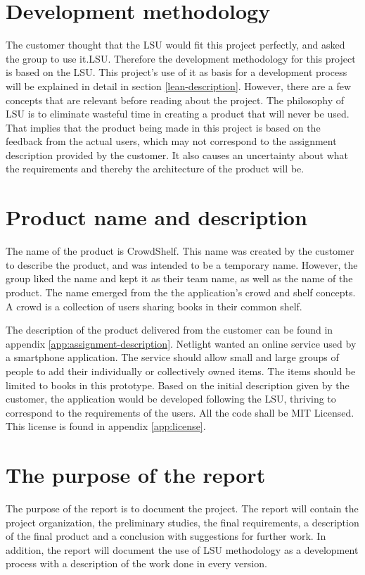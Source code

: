 \section{Development methodology}
\label{dev-meth}
The customer thought that the \gls{LSU} would fit this project perfectly, and asked the group to use it.\gls{LSU}.\cite{lean-startup}
Therefore the development methodology for this project is based on the \gls{LSU}. This project's use of it as basis for a development process will be explained in detail in section \ref{lean-description}. However, there are a few concepts that are relevant before reading about the project. The philosophy of \gls{LSU} is to eliminate wasteful time in creating a product that will never be used. That implies that the product being made in this project is based on the feedback from the actual users, which may not correspond to the assignment description provided by the customer. It also causes an uncertainty about what the requirements and thereby the architecture of the product will be.

\section{Product name and description}
\label{product}
The name of the product is CrowdShelf. This name was created by the customer to describe the product, and was intended to be a temporary name. However, the group liked the name and kept it as their team name, as well as the name of the product. The name emerged from the the application's crowd and shelf concepts. A crowd is a collection of users sharing books in their common shelf.

The description of the product delivered from the customer can be found in appendix \ref{app:assignment-description}. Netlight wanted an online service used by a smartphone application. The service should
allow small and large groups of people to add their individually or collectively owned items. The items should be limited to books in this prototype. Based on the initial description given by the customer, the application would be developed following the \gls{LSU}, thriving to correspond to the requirements of the users.  All the code shall be MIT Licensed. This license is found in appendix \ref{app:license}.


\section{The purpose of the report}
\label{report}
The purpose of the report is to document the project. The report will contain the project organization, the preliminary studies, the final requirements, a description of the final product and a conclusion with suggestions for further work. In addition, the report will document the use of \gls{LSU} methodology as a development process with a description of the work done in every version. 

